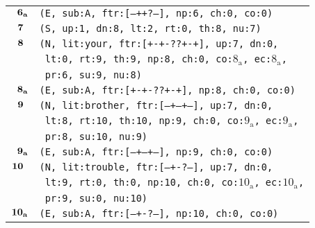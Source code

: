 \documentclass{article}
\begin{document}
\begin{minipage}{\textwidth}
{\begin{tabular}{|r|l|}
    ${\textbf{\textrm{6}}_{\textbf{\textrm{a}}}}$ & \texttt{\texttt{(E,~sub:A,~ftr:[---++?---],~np:6,~ch:0,~co:0)}} \\
    ${\textbf{\textrm{7}}_{\phantom{z}}}$ & \texttt{\texttt{(S,~up:1,~dn:8,~lt:2,~rt:0,~th:8,~nu:7)}} \\
    ${\textbf{\textrm{8}}_{\phantom{z}}}$ & \texttt{\texttt{(N,~lit:your,~ftr:[+-+-??+-+],~up:7,~dn:0,}} \\
    & \texttt{\texttt{~lt:0,~rt:9,~th:9,~np:8,~ch:0,~co:${\textrm{8}_{\textrm{a}}}$,~ec:${\textrm{8}_{\textrm{a}}}$,}} \\
    & \texttt{\texttt{~pr:6,~su:9,~nu:8)}} \\
    ${\textbf{\textrm{8}}_{\textbf{\textrm{a}}}}$ & \texttt{\texttt{(E,~sub:A,~ftr:[+-+-??+-+],~np:8,~ch:0,~co:0)}} \\
    ${\textbf{\textrm{9}}_{\phantom{z}}}$ & \texttt{\texttt{(N,~lit:brother,~ftr:[---+--+--],~up:7,~dn:0,}} \\
    & \texttt{\texttt{~lt:8,~rt:10,~th:10,~np:9,~ch:0,~co:${\textrm{9}_{\textrm{a}}}$,~ec:${\textrm{9}_{\textrm{a}}}$,}} \\
    & \texttt{\texttt{~pr:8,~su:10,~nu:9)}} \\
    ${\textbf{\textrm{9}}_{\textbf{\textrm{a}}}}$ & \texttt{\texttt{(E,~sub:A,~ftr:[---+--+--],~np:9,~ch:0,~co:0)}} \\
    ${\textbf{\textrm{10}}_{\phantom{z}}}$ & \texttt{\texttt{(N,~lit:trouble,~ftr:[---+-?---],~up:7,~dn:0,}} \\
    & \texttt{\texttt{~lt:9,~rt:0,~th:0,~np:10,~ch:0,~co:${\textrm{10}_{\textrm{a}}}$,~ec:${\textrm{10}_{\textrm{a}}}$,}} \\
    & \texttt{\texttt{~pr:9,~su:0,~nu:10)}} \\
    ${\textbf{\textrm{10}}_{\textbf{\textrm{a}}}}$ & \texttt{\texttt{(E,~sub:A,~ftr:[---+-?---],~np:10,~ch:0,~co:0)}} \\
    \hline
  \end{tabular}
  }
\end{minipage}
\bigbreak
\end{document}
